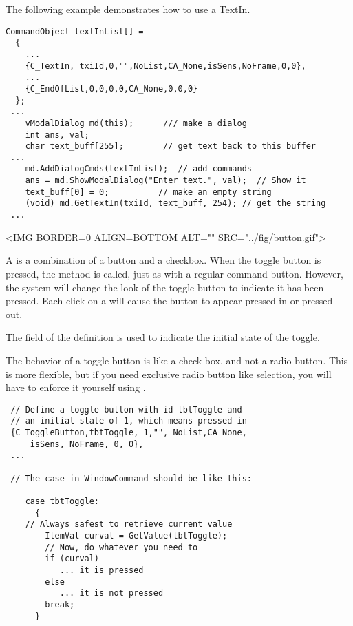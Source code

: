 The following example demonstrates how to use a TextIn.

\footnotesize
\begin{verbatim}
CommandObject textInList[] =
  {
    ...
    {C_TextIn, txiId,0,"",NoList,CA_None,isSens,NoFrame,0,0},
    ...
    {C_EndOfList,0,0,0,0,CA_None,0,0,0}
  };
 ...
    vModalDialog md(this);      /// make a dialog
    int ans, val;
    char text_buff[255];        // get text back to this buffer
 ...
    md.AddDialogCmds(textInList);  // add commands
    ans = md.ShowModalDialog("Enter text.", val);  // Show it
    text_buff[0] = 0;          // make an empty string
    (void) md.GetTextIn(txiId, text_buff, 254); // get the string
 ...
\end{verbatim}
\normalfont\normalsize


\small
\begin{rawhtml}
<IMG BORDER=0 ALIGN=BOTTOM ALT="" SRC="../fig/button.gif">
\end{rawhtml}
\begin{latexonly}

\end{latexonly}
\normalfont\normalsize
\vspace{.1in}

A  is a combination of a
button and a checkbox. When the toggle button is pressed,
the  method is called, just
as with a regular command button. However, the system will change
the look of the toggle button to indicate it has been
pressed. Each click on a  will cause
the button to appear pressed in or pressed out.

The  field of the 
definition is used to indicate the initial state of the
toggle.

The behavior of a toggle button is like a check box, and
not a radio button. This is more flexible, but if you need
exclusive radio button like selection, you will have to
enforce it yourself using . 

\begin{verbatim}
 // Define a toggle button with id tbtToggle and
 // an initial state of 1, which means pressed in
 {C_ToggleButton,tbtToggle, 1,"", NoList,CA_None,
     isSens, NoFrame, 0, 0},
 ...

 // The case in WindowCommand should be like this:

    case tbtToggle:
      {
	// Always safest to retrieve current value
        ItemVal curval = GetValue(tbtToggle);
        // Now, do whatever you need to
        if (curval)
           ... it is pressed
        else
           ... it is not pressed
        break;
      }

\end{verbatim}


